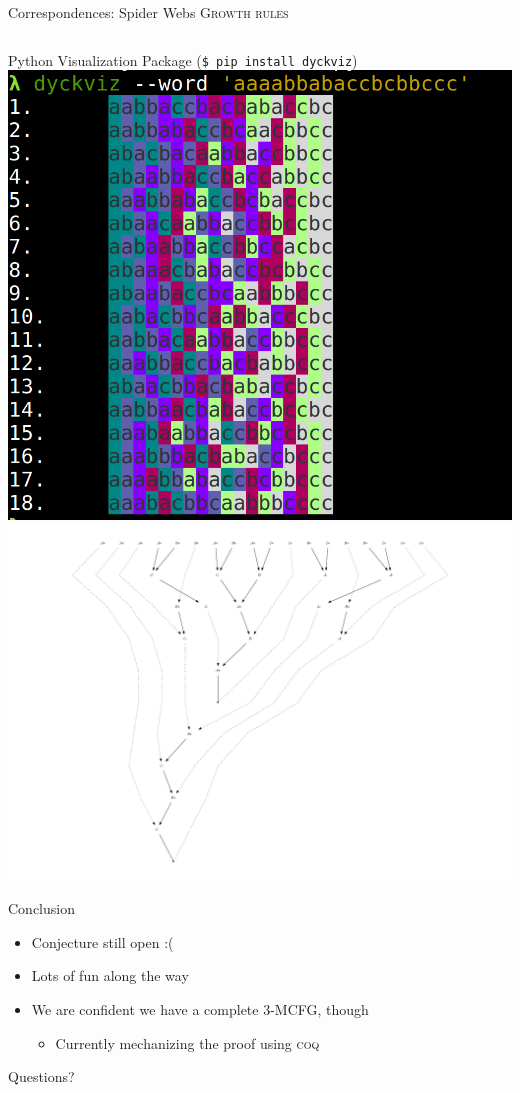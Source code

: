 \documentclass{beamer}
\newcommand\tsc[1]{\alert{\textsc{#1}}}
\begin{document}
	\begin{frame}{Correspondences: Spider Webs}
		\center \tsc{Growth rules}
		\vspace{-.6cm}
		\begin{figure}[h!]
			\[  \]
		\end{figure}
	\end{frame}
	
	\begin{frame}{Python Visualization Package (\texttt{\$ pip install dyckviz})}
	  \includegraphics[width=.5\textwidth]{terminal.png}
	  \includegraphics[width=.55\textwidth]{web.pdf}
  \end{frame}
  
  \begin{frame}{Conclusion}
    \begin{itemize}
    \item Conjecture still open :(
    \item Lots of fun along the way
    \item We are confident we have a complete 3-MCFG, though
      \begin{itemize}
      \item Currently mechanizing the proof using \textsc{coq}
      \end{itemize}
    \end{itemize}
  \end{frame}
  
  \begin{frame}[standout]
    Questions?
  \end{frame}
  
  	
\end{document}
